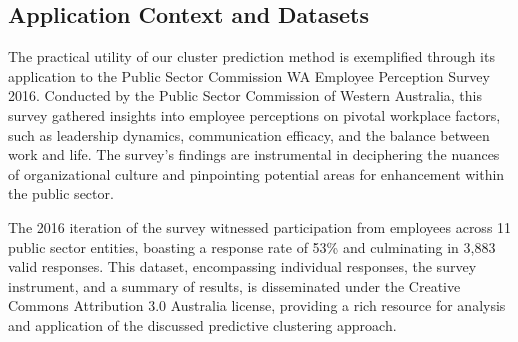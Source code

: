 \documentclass{article}
\begin{document}






\subsection{Application Context and Datasets}

The practical utility of our cluster prediction method is exemplified through its application to the Public Sector Commission WA Employee Perception Survey 2016. Conducted by the Public Sector Commission of Western Australia, this survey gathered insights into employee perceptions on pivotal workplace factors, such as leadership dynamics, communication efficacy, and the balance between work and life. The survey's findings are instrumental in deciphering the nuances of organizational culture and pinpointing potential areas for enhancement within the public sector.

The 2016 iteration of the survey witnessed participation from employees across 11 public sector entities, boasting a response rate of 53\% and culminating in 3,883 valid responses. This dataset, encompassing individual responses, the survey instrument, and a summary of results, is disseminated under the Creative Commons Attribution 3.0 Australia license, providing a rich resource for analysis and application of the discussed predictive clustering approach.
\end{document}
